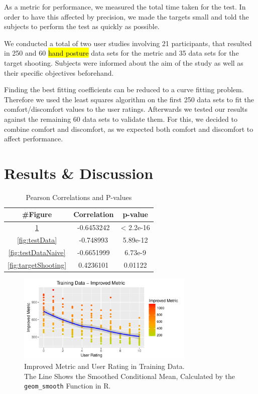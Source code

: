 \documentclass{sig-alternate-05-2015}
\begin{document}
As a metric for performance, we measured the total time taken for the test. In order to have this affected by precision, we made the targets small and told the subjects to perform the test as quickly as possible.

We conducted a total of two user studies involving 21 participants, that resulted in 250 and 60 \hl{hand posture} data sets for the metric and 35 data sets for the target shooting. Subjects were informed about the aim of the study as well as their specific objectives beforehand.

Finding the best fitting coefficients can be reduced to a curve fitting problem. Therefore we used the least squares algorithm on the first 250 data sets to fit the comfort/discomfort values to the user ratings. Afterwards we tested our results against the remaining 60 data sets to validate them. For this, we decided to combine comfort and discomfort, as we expected both comfort and discomfort to affect performance.

\section{Results \& Discussion}

\begin{table}[b]
\centering
\begin{tabular}{|c|c|c|} \hline
\#Figure & Correlation & p-value\\ \hline
\ref{fig:trainingData} & -0.6453242 & < 2.2e-16\\ \hline
\ref{fig:testData} & -0.748993 & 5.89e-12\\ \hline
\ref{fig:testDataNaive} & -0.6651999 & 6.73e-9\\ \hline
\ref{fig:targetShooting} & 0.4236101 & 0.01122\\ \hline
\end{tabular}
\caption{Pearson Correlations and P-values}
\label{tab:correlations}
\end{table}

\begin{figure}[b]
\centering
\includegraphics[width=8.45cm]{TrainingDataImproved}
\vspace{-20pt}
\caption{Improved Metric and User Rating in Training Data. \\
The Line Shows the Smoothed Conditional Mean, Calculated by the \texttt{geom\_smooth} Function in R.}
\label{fig:trainingData}
\vspace{-10pt}
\end{figure}
\end{document}
